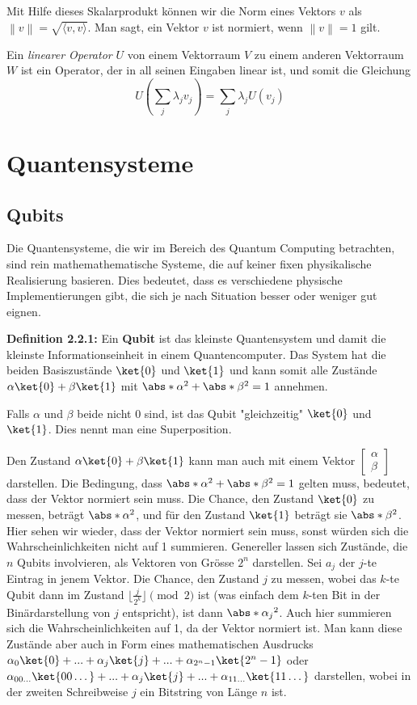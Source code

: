 Mit Hilfe dieses Skalarprodukt können wir die Norm eines Vektors $v$ als $\left\| v \right\| = \sqrt{\langle v, v \rangle}$. Man sagt, ein Vektor $v$ ist normiert, wenn $\left\| v \right\| = 1$ gilt.

Ein \textit{linearer Operator} $U$ von einem Vektorraum $V$ zu einem anderen Vektorraum $W$ ist ein Operator, der in all seinen Eingaben linear ist, und somit die Gleichung $$U(\sum_j{\lambda_j v_j}) = \sum_j\lambda_j U(v_j)$$
\section{Quantensysteme}
\subsection{Qubits}
Die Quantensysteme, die wir im Bereich des Quantum Computing betrachten, sind rein mathemathematische Systeme, die auf keiner fixen physikalische Realisierung basieren. Dies bedeutet, dass es verschiedene physische Implementierungen gibt, die sich je nach Situation besser oder weniger gut eignen.

\textbf{Definition 2.2.1:} Ein \textbf{Qubit} ist das kleinste Quantensystem und damit die kleinste Informationseinheit in einem Quantencomputer. Das System hat die beiden Basiszustände $\ket{0}$ und $\ket{1}$ und kann somit alle Zustände $\alpha\ket{0} + \beta\ket{1}$ mit $\abs*{\alpha}^2 + \abs*{\beta}^2 = 1$ annehmen.

Falls $\alpha$ und $\beta$ beide nicht 0 sind, ist das Qubit "gleichzeitig" $\ket{0}$ und $\ket{1}$. Dies nennt man eine Superposition. 

Den Zustand $\alpha\ket{0} + \beta\ket{1}$ kann man auch mit einem Vektor $\begin{bmatrix}\alpha \\ \beta\end{bmatrix}$ darstellen. Die Bedingung, dass $\abs*{\alpha}^2 + \abs*{\beta}^2 = 1$ gelten muss, bedeutet, dass der Vektor normiert sein muss. Die Chance, den Zustand $\ket{0}$ zu messen, beträgt $\abs*{\alpha}^2$, und für den Zustand $\ket{1}$ beträgt sie $\abs*{\beta}^2$. Hier sehen wir wieder, dass der Vektor normiert sein muss, sonst würden sich die Wahrscheinlichkeiten nicht auf 1 summieren.
Genereller lassen sich Zustände, die $n$ Qubits involvieren, als Vektoren von Grösse $2^n$ darstellen. Sei $a_j$ der $j$-te Eintrag in jenem Vektor. Die Chance, den Zustand $j$ zu messen, wobei das $k$-te Qubit dann im Zustand $\lfloor \frac{j}{2^k} \rfloor \pmod{2}$ ist (was einfach dem $k$-ten Bit in der Binärdarstellung von $j$ entspricht), ist dann $\abs*{\alpha_j}^2$. Auch hier summieren sich die Wahrscheinlichkeiten auf 1, da der Vektor normiert ist. Man kann diese Zustände aber auch in Form eines mathematischen Ausdrucks $\alpha_0\ket{0} + ... + \alpha_j\ket{j} + ... + \alpha_{2^n - 1}\ket{2^n - 1}$ oder $\alpha_{00\dots}\ket{00\dots} + ... + \alpha_{j}\ket{j} + ... + \alpha_{11\dots}\ket{11\dots}$ darstellen, wobei in der zweiten Schreibweise $j$ ein Bitstring von Länge $n$ ist.

